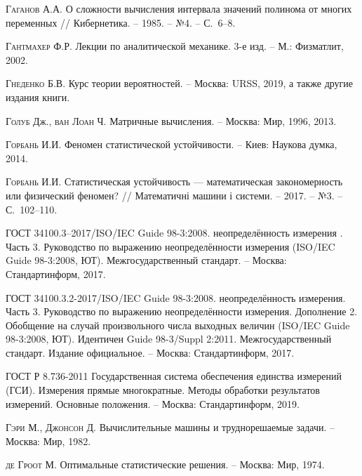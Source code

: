 \documentclass[a5paper,openany]{book}
\begin{document}
\begin{thebibliography}{999}
\textsc{Гаганов А.А.} О сложности вычисления интервала значений полинома от многих 
переменных // Кибернетика. -- 1985. -- №4. -- С.~6--8. 
  
\textsc{Гантмахер Ф.Р.} Лекции по аналитической механике. 3-е изд. 
-- М.: Физматлит, 2002. 
  
\textsc{Гнеденко Б.В.} Курс теории вероятностей. -- Москва: URSS, 2019, 
а также другие издания книги. 
  
\textsc{Голуб Дж., ван Лоан Ч.} Матричные вычисления. -- Москва: Мир, 1996, 2013. 
  
\textsc{Горбань И.И.} Феномен статистической устойчивости. -- Киев: Наукова думка, 2014. 
  
\textsc{Горбань И.И.} Статистическая устойчивость --- математическая закономерность или 
физический феномен? // Математичні машини і системи. -- 2017. -- №3. -- С.~102--110.  
  
ГОСТ 34100.3–2017/ISO/IEC Guide 98-3:2008.  неопределённость измерения . Часть 3. 
Руководство по выражению неопределённости измерения (ISO/IEC Guide 98-3:2008, ЮТ). 
Межгосударственный стандарт. -- Москва: Стандартинформ, 2017. 
  
ГОСТ 34100.3.2-2017/ISO/IEC Guide 98-3:2008. неопределённость измерения. Часть 3. 
Руководство по выражению неопределённости измерения. Дополнение 2. Обобщение 
на случай произвольного числа выходных величин (ISO/IEC Guide 98-3:2008, ЮТ). 
Идентичен Guide 98-3/Suppl 2:2011. Межгосударственный стандарт. Издание 
официальное. -- Москва: Стандартинформ, 2017. 
  
ГОСТ Р 8.736-2011 Государственная система обеспечения единства измерений (ГСИ). 
Измерения прямые многократные. Методы обработки результатов измерений. 
Основные положения. -- Москва: Стандартинформ, 2019.  
  
\textsc{Гэри М., Джонсон Д.} Вычислительные машины и труднорешаемые задачи. 
-- Москва: Мир, 1982. 
  
\textsc{де Гроот М.} Оптимальные статистические решения. -- Москва: Мир, 1974. 
  

\end{thebibliography}
\end{document}
